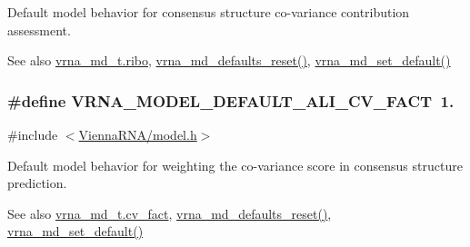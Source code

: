 Default model behavior for consensus structure co-\/variance contribution assessment. 

\begin{DoxySeeAlso}{See also}
\hyperlink{structvrna__md__s_a3df2ae4bd9c133ef8ab92a53b1d035ec}{vrna\+\_\+md\+\_\+t.\+ribo}, \hyperlink{group__model__details_ga70834424cf804d149937de89f80ceb45}{vrna\+\_\+md\+\_\+defaults\+\_\+reset()}, \hyperlink{group__model__details_ga8ac6ff84936282436f822644bf841f66}{vrna\+\_\+md\+\_\+set\+\_\+default()} 
\end{DoxySeeAlso}
\subsubsection[{\texorpdfstring{V\+R\+N\+A\+\_\+\+M\+O\+D\+E\+L\+\_\+\+D\+E\+F\+A\+U\+L\+T\+\_\+\+A\+L\+I\+\_\+\+C\+V\+\_\+\+F\+A\+CT}{VRNA_MODEL_DEFAULT_ALI_CV_FACT}}]{\setlength{\rightskip}{0pt plus 5cm}\#define V\+R\+N\+A\+\_\+\+M\+O\+D\+E\+L\+\_\+\+D\+E\+F\+A\+U\+L\+T\+\_\+\+A\+L\+I\+\_\+\+C\+V\+\_\+\+F\+A\+CT~1.}\hypertarget{group__model__details_gaaaf3d73d6abc18d3889676952bfedb96}{}\label{group__model__details_gaaaf3d73d6abc18d3889676952bfedb96}


{\ttfamily \#include $<$\hyperlink{model_8h}{Vienna\+R\+N\+A/model.\+h}$>$}



Default model behavior for weighting the co-\/variance score in consensus structure prediction. 

\begin{DoxySeeAlso}{See also}
\hyperlink{structvrna__md__s_a62ebefb9d0643e5c4c8a2ec84a105ce6}{vrna\+\_\+md\+\_\+t.\+cv\+\_\+fact}, \hyperlink{group__model__details_ga70834424cf804d149937de89f80ceb45}{vrna\+\_\+md\+\_\+defaults\+\_\+reset()}, \hyperlink{group__model__details_ga8ac6ff84936282436f822644bf841f66}{vrna\+\_\+md\+\_\+set\+\_\+default()} 
\end{DoxySeeAlso}
